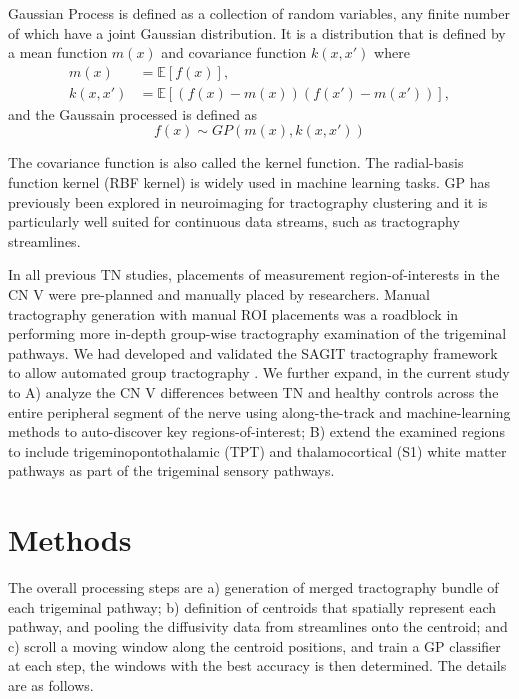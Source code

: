 Gaussian Process is defined \cite{rasmussen2006gaussian} as a collection of random variables, any finite number of which have a joint Gaussian distribution. 
It is a distribution that is defined by a mean function $m(x)$ and covariance function $k(x,x') $ where
\begin{equation}
	\begin{split}
		m(x) &= \mathbb{E}[f(x)], \\
		k(x,x') &= \mathbb{E}[(f(x)-m(x))(f(x')-m(x'))],
	\end{split}
\end{equation}
and the Gaussain processed is defined as
\begin{equation}
f(x) \sim GP(m(x), k(x, x')) 
\end{equation}

The covariance function is also called the kernel function. The radial-basis function kernel (RBF kernel) is widely used in machine learning tasks. GP has previously been explored in neuroimaging for tractography clustering \cite{Wassermann2010} and it is particularly well suited for continuous data streams, such as tractography streamlines.

In all previous TN studies, placements of measurement region-of-interests in the CN V were pre-planned and manually placed by researchers. Manual tractography generation with manual ROI placements was a roadblock in performing more in-depth group-wise tractography examination of the trigeminal pathways. We had developed and validated the SAGIT tractography framework to allow automated group tractography \cite{Chen2016}. We further expand, in the current study to A) analyze the CN V differences between TN and healthy controls across the entire peripheral segment of the nerve using along-the-track and machine-learning methods to auto-discover key regions-of-interest; B) extend the examined regions to include trigeminopontothalamic (TPT) and thalamocortical (S1) white matter pathways as part of the trigeminal sensory pathways.

\section{Methods}

The overall processing steps are a) generation of merged tractography bundle of each trigeminal pathway; b) definition of centroids that spatially represent each pathway, and pooling the diffusivity data from streamlines onto the centroid; and c) scroll a moving window along the centroid positions, and train a GP classifier at each step, the windows with the best accuracy is then determined. The details are as follows.

